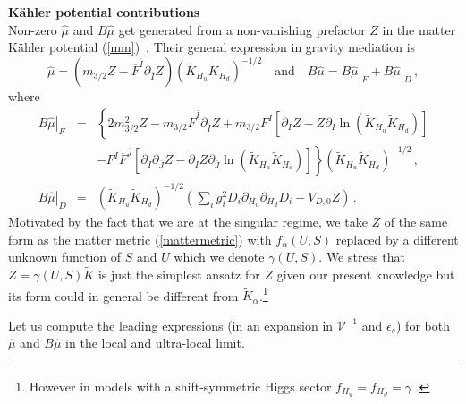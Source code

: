 \documentclass[11pt,a4paper]{article}
\newcommand{\be}{\begin{equation}}
\newcommand{\ee}{\end{equation}}
\newcommand\vo{{\mathcal{V}}}
\begin{document}
\noindent \textbf{K\"ahler potential contributions}\medskip\\
Non-zero $\hat{\mu}$ and $B \hat{\mu}$ get generated from a non-vanishing prefactor $Z$ in the matter K\"ahler potential (\ref{mm})~\cite{Kim:1983dt,Giudice:1988yz}. Their general expression in gravity mediation is \cite{Brignole:1993dj,Dudas:2005vv}
\be
\hat{\mu} = \left(m_{3/2} Z - \overline{F}^{\overline{I}} \partial_{\overline{I}} Z\right)
\left(\tilde{K}_{H_u} \tilde{K}_{H_d}\right)^{-1/2}\quad\text{and}\quad B\hat{\mu} = \left.B\hat{\mu}\right|_F + \left.B\hat{\mu}\right|_D\,,
\label{muK}
\ee
where
\begin{eqnarray}
\left.B\hat{\mu}\right|_F &=& \left\{2 m_{3/2}^2 Z - m_{3/2} \overline{F}^{\overline{I}} \partial_{\overline{I}} Z + m_{3/2} F^I \left[\partial_I Z - Z \partial_I \ln\left(\tilde{K}_{H_u} \tilde{K}_{H_d}\right)\right]\right. \nonumber \\
&& \left. - F^I \overline{F}^{\overline{J}} \left[\partial_I \partial_{\overline{J}} Z - \partial_I Z \partial_{\overline{J}} \ln\left(\tilde{K}_{H_u} \tilde{K}_{H_d}\right)\right] \right\}\left(\tilde{K}_{H_u} \tilde{K}_{H_d}\right)^{-1/2} \,, \label{BmuKF} \\
\left.B\hat{\mu}\right|_D &=& \left(\tilde{K}_{H_u} \tilde{K}_{H_d}\right)^{-1/2}\left(\sum_i g_i^2 D_i \partial_{H_u} \partial_{H_d} D_i - V_{D,0} Z\right)\,.
\label{BmuKD}
\end{eqnarray}
Motivated by the fact that we are at the singular regime, we take $Z$ of the same form as the matter metric (\ref{mattermetric})
with $f_\alpha(U,S)$ replaced by a different unknown function of $S$ and $U$ which we denote $\gamma(U,S)$.
We stress that $Z=\gamma(U,S)\tilde{K}$ is just the simplest ansatz for $Z$ given our present knowledge
but its form could in general be different from $\tilde{K}_\alpha$.\footnote{However in models with a shift-symmetric Higgs sector $f_{H_u}=f_{H_d}=\gamma$ \cite{LopesCardoso:1994is,Antoniadis:1994hg,Brignole:1995fb,Brignole:1996xb,Hebecker:2012qp}.}

Let us compute the leading expressions (in an expansion in $\vo^{-1}$ and $\epsilon_s$) for both $\hat\mu$ and $B\hat\mu$
in the local and ultra-local limit.
\end{document}
